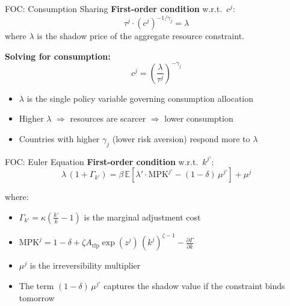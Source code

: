 \documentclass[aspectratio=169,11pt]{beamer}
\newcommand{\emphc}[1]{\textcolor{harvardcrimson}{#1}}
\newcommand{\E}[1]{\mathbb{E}\!\left[#1\right]}
\begin{document}
\begin{frame}{FOC: Consumption Sharing}
\textbf{First-order condition} w.r.t.\ $c^j$:
\[
\tau^j \cdot (c^j)^{-1/\gamma_j} = \lambda
\]
where $\lambda$ is the \emphc{shadow price} of the aggregate resource constraint.

\vspace{0.5em}
\textbf{Solving for consumption:}
\[
\boxed{c^j = \left(\frac{\lambda}{\tau^j}\right)^{-\gamma_j}}
\]

\vspace{0.5em}
\begin{itemize}
    \item $\lambda$ is the \emphc{single} policy variable governing consumption allocation
    \item Higher $\lambda$ $\Rightarrow$ resources are scarcer $\Rightarrow$ lower consumption
    \item Countries with higher $\gamma_j$ (lower risk aversion) respond more to $\lambda$
\end{itemize}
\end{frame}

\begin{frame}{FOC: Euler Equation}
\textbf{First-order condition} w.r.t.\ $k^{j\prime}$:
\[
\lambda\,(1 + \Gamma_{k'}) = \beta\,\E{\lambda' \cdot \text{MPK}^{j\prime} - (1-\delta)\,\mu^{j\prime}} + \mu^j
\]

where:
\begin{itemize}
    \item $\Gamma_{k'} = \kappa\!\left(\frac{k'}{k} - 1\right)$ is the marginal adjustment cost
    \item $\text{MPK}^j = 1 - \delta + \zeta A_{\text{tfp}} \exp(z^j)\,(k^j)^{\zeta-1} - \frac{\partial \Gamma}{\partial k}$
    \item $\mu^j$ is the \emphc{irreversibility multiplier}
    \item The term $(1-\delta)\,\mu^{j\prime}$ captures the \emphc{shadow value} if the constraint binds tomorrow
\end{itemize}
\end{frame}
\end{document}

